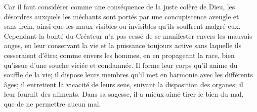 Car il faut considérer comme une conséquence de la juste colère de Dieu,
	les désordres auxquels les méchants sont portés
	par une concupiscence aveugle et sans frein,
	ainsi que les maux visibles ou invisibles qu’ils souffrent malgré eux.
Cependant la bonté du Créateur
	n’a pas cessé de se manifester envers les mauvais anges,
	en leur conservant la vie et la puissance toujours active
	sans laquelle ils cesseraient d’être;
	comme envers les hommes, en en propageant la race,
	bien qu’issue d’une souche viciée et condamnée.
Il forme leur corps qu’il anime du souffle de la vie;
	il dispose leurs membres qu’il met en harmonie avec les différents âges;
	il entretient la vicacité de leurs sens,
		suivant la disposition des organes;
	il leur fournit des aliments.
Dans sa sagesse, il a mieux aimé tirer le bien du mal,
	que de ne permettre aucun mal.
